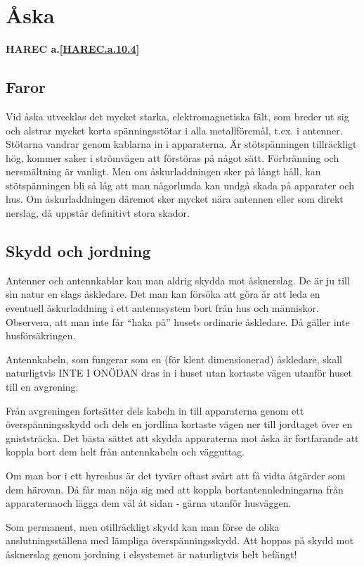\section{Åska}
\textbf{
HAREC a.\ref{HAREC.a.10.4}\label{myHAREC.a.10.4}
}

\subsection{Faror}

Vid åska utvecklas det mycket starka, elektromagnetiska fält, som
breder ut sig och alstrar mycket korta spänningsstötar i alla
metallföremål, t.ex. i antenner. Stötarna vandrar genom kablarna in i
apparaterna. Är stötspänningen tillräckligt hög, kommer saker i
strömvägen att förstöras på något sätt.  Förbränning och nersmältning
är vanligt.  Men om åskurladdningen sker på långt håll, kan
stötspänningen bli så låg att man någorlunda kan undgå skada på
apparater och hus. Om åskurladdningen däremot sker mycket nära
antennen eller som direkt nerslag, då uppstår definitivt stora skador.

\subsection{Skydd och jordning}

Antenner och antennkablar kan man aldrig skydda mot åsknerslag. De är
ju till sin natur en slags åskledare. Det man kan försöka att göra är
att leda en eventuell åskurladdning i ett antennsystem bort från hus
och människor. Observera, att man inte får ``haka på'' husets
ordinarie åskledare. Då gäller inte husförsäkringen.

Antennkabeln, som fungerar som en (för klent dimensionerad) åskledare,
skall naturligtvis INTE I ONÖDAN dras in i huset utan kortaste vägen
utanför huset till en avgrening.

Från avgreningen fortsätter dels kabeln in till apparaterna genom ett
överspänningsskydd och dels en jordlina kortaste vägen ner till
jordtaget över en gniststräcka. Det bästa sättet att skydda
apparaterna mot åska är fortfarande att koppla bort dem helt från
antennkabeln och vägguttag.

Om man bor i ett hyreshus är det tyvärr oftast svårt att få vidta
åtgärder som dem härovan. Då får man nöja sig med att koppla
bortantennledningarna från apparaternaoch lägga dem väl åt sidan -
gärna utanför husväggen.

Som permanent, men otillräckligt skydd kan man förse de olika
anslutningsställena med lämpliga överspänningsskydd.  Att hoppas på
skydd mot åsknerslag genom jordning i elsystemet är naturligtvis
helt befängt!
